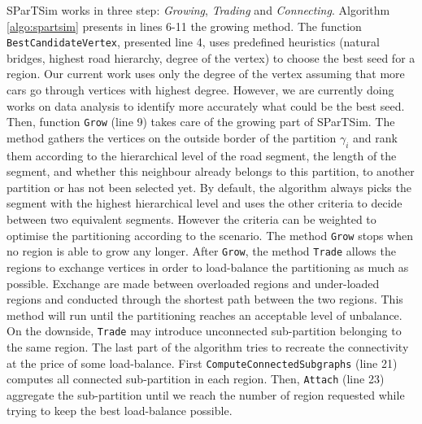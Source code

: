 SParTSim works in three step: \textit{Growing}, \textit{Trading} and \textit{Connecting}. Algorithm \ref{algo:spartsim} presents in lines 6-11 the growing method. The function \verb+BestCandidateVertex+, presented line 4, uses predefined heuristics (natural bridges, highest road hierarchy, degree of the vertex) to choose the best seed for a region. Our current work uses only the degree of the vertex assuming that more cars go through vertices with highest degree. However, we are currently doing works on data analysis to identify more accurately what could be the best seed. Then, function \verb+Grow+ (line 9) takes care of the growing part of SParTSim. The method gathers the vertices on the outside border of the partition $\gamma_i$ and rank them according to the hierarchical level of the road segment, the length of the segment, and whether this neighbour already belongs to this partition, to another partition or has not been selected yet. By default, the algorithm always picks the segment with the highest hierarchical level and uses the other criteria to decide between two equivalent segments. However the criteria can be weighted to optimise the partitioning according to the scenario. The method \verb+Grow+ stops when no region is able to grow any longer. After \verb+Grow+, the method \verb+Trade+ allows the regions to exchange vertices in order to load-balance the partitioning as much as possible. Exchange are made between overloaded regions and under-loaded regions and conducted through the shortest path between the two regions. This method will run until the partitioning reaches an acceptable level of unbalance. On the downside, \verb+Trade+ may introduce unconnected sub-partition belonging to the same region. The last part of the algorithm tries to recreate the connectivity at the price of some load-balance. First \verb+ComputeConnectedSubgraphs+ (line 21) computes all connected sub-partition in each region. Then, \verb+Attach+ (line 23) aggregate the sub-partition until we reach the number of region requested while trying to keep the best load-balance possible.


